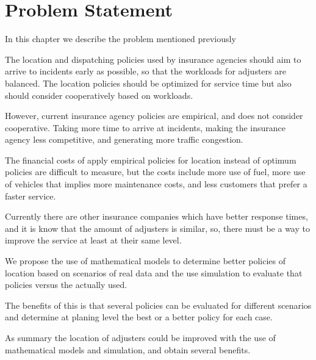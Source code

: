 \section{Problem Statement}
In this chapter we describe the problem
mentioned previously

The location and dispatching policies
used by insurance agencies
should aim
to arrive to incidents
early as possible,
so that
the workloads for adjusters are balanced.
The location policies
should be optimized for service time
but also should consider
cooperatively
based on workloads.

However,
current insurance agency policies
are empirical,
and does not consider cooperative.
Taking more time to arrive at incidents,
making the insurance agency
less competitive,
and generating more traffic congestion.

The financial costs
of apply
empirical policies for location
instead of optimum policies
are difficult to measure,
but the costs include
more use of fuel,
more use of vehicles
that implies
more maintenance costs,
and less customers
that prefer a faster service.

Currently
there are other
insurance companies
which have
better response times,
and
it is know
that the amount of adjusters
is similar,
so,
there must be
a way to improve the service
at least at their same level.

We propose
the use of mathematical models
to determine better policies of location
based on scenarios
of real data
and the use simulation
to evaluate that policies
versus the actually used.

The benefits of this
is that several policies
can be evaluated
for different scenarios
and determine
at planing level
the best or a better policy
for each case.

As summary
the location of adjusters
could be improved
with the use of
mathematical models and simulation,
and obtain several benefits.


